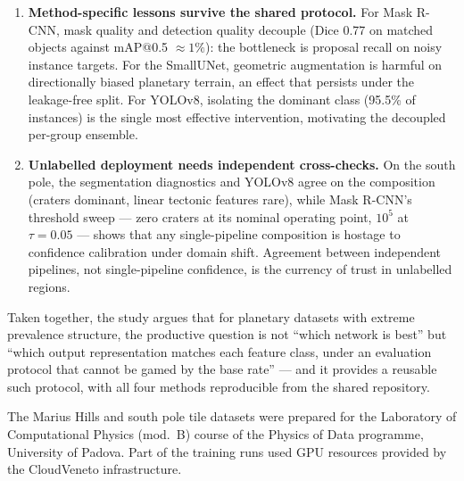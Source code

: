 \begin{enumerate}
    \item \textbf{Method-specific lessons survive the shared protocol.} For Mask R-CNN, mask quality and detection quality decouple (Dice 0.77 on matched objects against mAP@0.5 $\approx1\%$): the bottleneck is proposal recall on noisy instance targets. For the SmallUNet, geometric augmentation is harmful on directionally biased planetary terrain, an effect that persists under the leakage-free split. For YOLOv8, isolating the dominant class (95.5\% of instances) is the single most effective intervention, motivating the decoupled per-group ensemble.

    \item \textbf{Unlabelled deployment needs independent cross-checks.} On the south pole, the segmentation diagnostics and YOLOv8 agree on the composition (craters dominant, linear tectonic features rare), while Mask R-CNN's threshold sweep --- zero craters at its nominal operating point, $10^5$ at $\tau=0.05$ --- shows that any single-pipeline composition is hostage to confidence calibration under domain shift. Agreement between independent pipelines, not single-pipeline confidence, is the currency of trust in unlabelled regions.
\end{enumerate}

Taken together, the study argues that for planetary datasets with extreme prevalence structure, the productive question is not ``which network is best'' but ``which output representation matches each feature class, under an evaluation protocol that cannot be gamed by the base rate'' --- and it provides a reusable such protocol, with all four methods reproducible from the shared repository.

\begin{acknowledgements}
      The Marius Hills and south pole tile datasets were prepared for the Laboratory of Computational Physics (mod.~B) course of the Physics of Data programme, University of Padova. Part of the training runs used GPU resources provided by the CloudVeneto infrastructure.
\end{acknowledgements}

